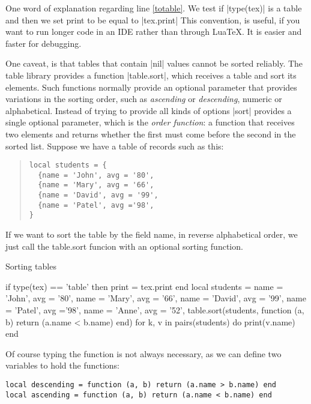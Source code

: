 One word of explanation regarding line \ref{totable}. We test if |type(tex)| is a table and then we set print to be equal to |tex.print|
This convention, is useful, if you want to run longer code in an IDE rather than through LuaTeX. It is easier and faster
for debugging.

One caveat, is that tables that contain |nil| values cannot be sorted reliably. The table library provides a function |table.sort|, which receives a table and sort its elements. Such functions normally provide an optional parameter that provides variations in the sorting order, such as \emph{ascending} or \emph{descending}, numeric or alphabetical. Instead of trying to provide all kinds of options |sort| provides a single optional parameter, which is the \emph{order function}: a function that receives two elements and returns whether the first must come before the second in the 
sorted list. Suppose we have a table of records such as this:

\begin{quote}
\begin{verbatim}
local students = {
  {name = 'John', avg = '80',
  {name = 'Mary', avg = '66',
  {name = 'David', avg = '99', 
  {name = 'Patel', avg ='98',
}
\end{verbatim}
\end{quote}

If we want to sort the table by the field name, in reverse alphabetical order, we
just call the {\color{thered}\ttfamily table.sort}  funcion with an optional sorting function.

\begin{texexample}{Sorting tables}{}
\begin{luacode}
if type(tex) == 'table' then print = tex.print end
local students = {
  {name = 'John', avg = '80'},
  {name = 'Mary', avg = '66'},
  {name = 'David', avg = '99'}, 
  {name = 'Patel', avg ='98'},
  {name = 'Anne', avg = '52'},
}
table.sort(students, function (a, b) return (a.name < b.name) end)
for k, v in pairs(students) do
  print(v.name)
end
\end{luacode}
\end{texexample}

Of course typing the function is not always necessary, as we can define two variables to hold the functions:

\begin{scriptexample}{}{}
\begin{verbatim}
local descending = function (a, b) return (a.name > b.name) end
local ascending = function (a, b) return (a.name < b.name) end
\end{verbatim}
\end{scriptexample}

